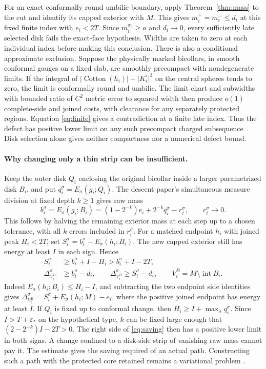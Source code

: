 \documentclass[11pt,letterpaper]{article}
\numberwithin{equation}{section}
\begin{document}
For an exact conformally round umbilic boundary, apply
Theorem~\ref{thm:mass} to the cut and identify its capped exterior
with \(M\). This gives
\(m_i^+=m_i^-\le d_i\) at this fixed finite index with \(e_i<2T\).
Since \(m_i^{\sigma_0}\ge a\) and \(d_i\to0\), every sufficiently
late selected disk fails the exact-face hypothesis. Widths are taken
to zero at each individual index before making this conclusion. There
is also a conditional approximate exclusion. Suppose the physically
marked bicollars, in smooth conformal gauges on a fixed slab, are
smoothly precompact with nondegenerate limits. If the integral of
\(|\operatorname{Cotton}(h_i)|+|K_i^\circ|^3\) on the central
spheres tends to zero, the limit is conformally round and umbilic.
The limit chart and subwidths with bounded ratio of \(C^2\) metric
error to squared width then produce \(o(1)\) complete-side and joined
costs, with clearance for any separately protected regions. Equation
\eqref{eq:finite} gives a contradiction at a finite late index.
Thus the defect has positive lower limit on any such precompact
charged subsequence~\cite{Baker2026CollarDeformation}. Disk selection
alone gives neither compactness nor a numerical defect bound.

\paragraph{Why changing only a thin strip can be insufficient.}
Keep the outer disk \(Q_i\) enclosing the original bicollar inside
a larger parametrized disk \(B_i\), and put \(q_i^\sigma=E_\sigma(g_i;Q_i)\).
The descent paper's simultaneous measure division at fixed depth \(k\ge1\)
gives raw mass
\[
 b_i^\sigma=E_\sigma(g_i;B_i)
  =(1-2^{-k})e_i+2^{-k}q_i^\sigma-r_i^\sigma,\qquad r_i^\sigma\to0 .
\]
This follows by halving the remaining exterior mass at each step
up to a chosen tolerance, with all \(k\) errors included in
\(r_i^\sigma\). For a matched endpoint \(h_i\) with joined peak
\(H_i<2T\), set \(S_i^\sigma=b_i^\sigma-E_\sigma(h_i;B_i)\).
The new capped exterior still has energy at least \(I\) in each
sign. Hence
\begin{align}
 S_i^\sigma &\ge b_i^\sigma+I-H_i>b_i^\sigma+I-2T,\label{eq:saving}\\
 \Delta_{V_i^B}^\sigma&\ge b_i^\sigma-d_i,\qquad
 \Delta_{V_i^B}^\sigma\ge S_i^\sigma-d_i,\qquad
 V_i^B=M\setminus\operatorname{int}B_i . \nonumber
\end{align}
Indeed \(E_\sigma(h_i;B_i)\le H_i-I\), and subtracting the two
endpoint side identities gives
\(\Delta_{V_i^B}^\sigma=S_i^\sigma+E_\sigma(h_i;M)-e_i\),
where the positive joined endpoint has energy at least \(I\).
If \(Q_i\) is fixed up to conformal change, then
\(H_i\ge I+\max_\sigma q_i^\sigma\).
Since \(I>T+\varepsilon_*\) on the hypothetical type, \(k\) can be
fixed large enough that \((2-2^{-k})I-2T>0\). The right side of
\eqref{eq:saving} then has a positive lower limit in both signs.
A change confined to a disk-side strip of vanishing raw mass cannot
pay it. The estimate gives the saving required of an actual path.
Constructing such a path with the protected core retained remains a variational problem
\cite{Baker2026ChiralMaster,Baker2026FixedDescent,Baker2026HandleCuts}.
\end{document}
